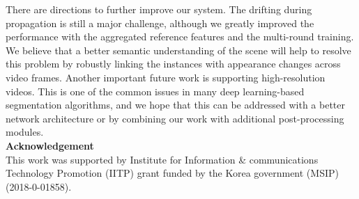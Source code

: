 \documentclass[10pt,twocolumn,letterpaper]{article}
\begin{document}
There are directions to further improve our system. The drifting during propagation is still a major challenge, although we greatly improved the performance with the aggregated reference features and the multi-round training. We believe that a better semantic understanding of the scene will help to resolve this problem by robustly linking the instances with appearance changes across video frames. Another important future work is supporting high-resolution videos. This is one of the common issues in many deep learning-based segmentation algorithms, and we hope that this can be addressed with a better network architecture or by combining our work with additional post-processing modules.\\



\noindent\textbf{\large{Acknowledgement}}\vspace{3pt}\\
This work was supported by Institute for Information \& communications Technology Promotion (IITP) grant funded by the Korea government (MSIP) (2018-0-01858).



{\small


}
\end{document}

